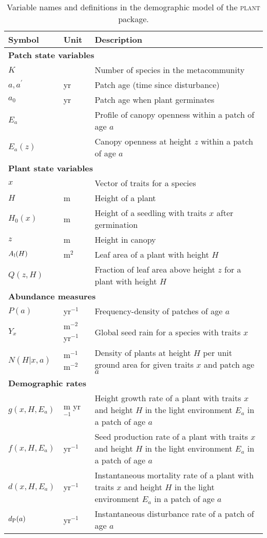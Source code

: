 \documentclass[10pt,twoside]{article}
\newcommand{\plant}{\textsc{plant}}
\begin{document}
\begin{table}[ht]
\caption{Variable names and definitions in the demographic model of the {\plant} package.}
\centering
\begin{tabular}{p{2cm}p{2cm}p{9cm}}
\hline
Symbol & Unit & Description \\
\hline
\multicolumn{3}{l}{\textbf{Patch state variables}} \\
$K$ & & Number of species in the metacommunity\\
$a, a^{\prime}$ & yr & Patch age (time since disturbance)\\
$a_0$ & yr & Patch age when plant germinates \\
$E_a$ & & Profile of canopy openness within a patch of age $a$\\
$E_a(z)$& & Canopy openness at height $z$ within a patch of age $a$\\

\multicolumn{3}{l}{\textbf{Plant state variables}} \\
$x$ & & Vector of traits for a species\\
$H$ & m & Height of a plant\\
$H_0(x)$ & m & Height of a seedling with traits $x$ after germination\\
$z$ & m & Height in canopy\\
$A_{\rm l}(H)$ & m$^2$ & Leaf area of a plant with height $H$ \\
$Q(z, H)$ & & Fraction of leaf area above height $z$ for a plant with height $H$\\

\multicolumn{3}{l}{\textbf{Abundance measures}} \\
$P(a)$ & yr$^{-1}$ & Frequency-density of patches of age $a$ \\
$Y_{x}$ & m$^{-2}$ yr$^{-1}$ & Global seed rain for a species with traits $x$\\
$N(H | x, a)$ & m$^{-1}$ m$^{-2}$ & Density of plants at height $H$ per unit ground area for given traits $x$ and patch age $a$\\

\multicolumn{3}{l}{\textbf{Demographic rates}} \\
$g(x, H, E_a)$ & m yr$^{-1}$ & Height growth rate of a plant with traits $x$ and height $H$ in the light environment $E_a$ in a patch of age $a$\\
$f(x, H, E_a)$ & yr$^{-1}$ & Seed production rate of a plant with traits $x$ and height $H$ in the light environment $E_a$ in a patch of age $a$\\
$d(x, H, E_a)$ & yr$^{-1}$ & Instantaneous mortality rate of a plant with traits $x$ and height $H$ in the light environment $E_a$ in a patch of age $a$\\
$d_{\rm P}(a)$ & yr$^{-1}$ & Instantaneous disturbance rate of a patch of age $a$\\


\end{tabular}
\end{table}
\end{document}
